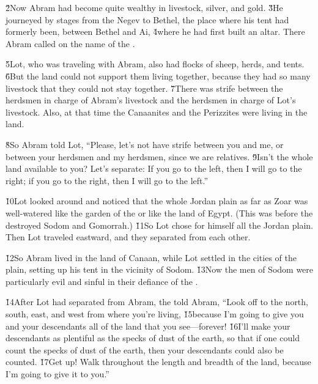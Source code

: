 \v{2}Now Abram had become quite wealthy in livestock, silver, and gold. \v{3}He journeyed by stages from the Negev to Bethel, the place where his tent had formerly been, between Bethel and Ai, \v{4}where he had first built an altar. There Abram called on the name of the .

\v{5}Lot, who was traveling with Abram, also had flocks of sheep, herds, and tents. \v{6}But the land could not support them living together, because they had so many livestock that they could not stay together. \v{7}There was strife between the herdsmen in charge of Abram's livestock and the herdsmen in charge of Lot's livestock. Also, at that time the Canaanites and the Perizzites were living in the land.

\v{8}So Abram told Lot, ``Please, let's not have strife between you and me, or between your herdsmen and my herdsmen, since we are relatives. \v{9}Isn't the whole land available to you? Let's separate: If you go to the left, then I will go to the right; if you go to the right, then I will go to the left.''

\v{10}Lot looked around and noticed that the whole Jordan plain as far as Zoar was well-watered like the garden of the  or like the land of Egypt. (This was before the  destroyed Sodom and Gomorrah.) \v{11}So Lot chose for himself all the Jordan plain. Then Lot traveled eastward, and they separated from each other.

\v{12}So Abram lived in the land of Canaan, while Lot settled in the cities of the plain, setting up his tent in the vicinity of Sodom. \v{13}Now the men of Sodom were particularly evil and sinful in their defiance of the .

\v{14}After Lot had separated from Abram, the  told Abram, ``Look off to the north, south, east, and west from where you're living, \v{15}because I'm going to give you and your descendants all of the land that you see---forever! \v{16}I'll make your descendants as plentiful as the specks of dust of the earth, so that if one could count the specks of dust of the earth, then your descendants could also be counted. \v{17}Get up! Walk throughout the length and breadth of the land, because I'm going to give it to you.''

